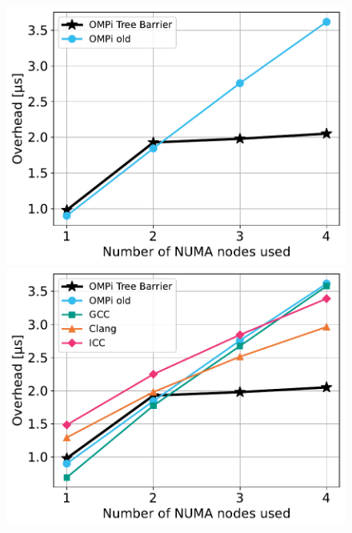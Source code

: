 
\begin{figure}[htbp]
    \centering
    \begin{minipage}{0.48\textwidth}
        \centering
        \includegraphics[width=1\textwidth]{Figures/paragon-epcc/ompionly_toponodes_tpn-6_close.pdf}
    \end{minipage}\hfill
    \begin{minipage}{0.48\textwidth}
        \centering
        \includegraphics[width=1\textwidth]{Figures/paragon-epcc/toponodes_tpn-6_close.pdf}

\end{minipage}
\end{figure}
